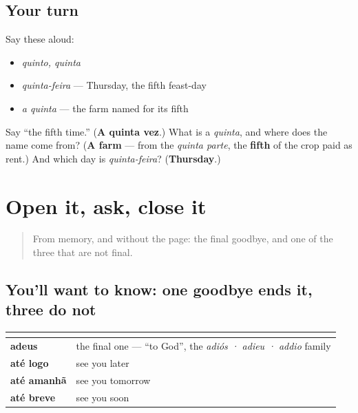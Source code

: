 \subsection*{Your turn}
Say these aloud:

\begin{itemize}
\raggedright
  \item \emph{quinto, quinta}
  \item \emph{quinta-feira} — Thursday, the fifth feast-day
  \item \emph{a quinta} — the farm named for its fifth
\end{itemize}

\begin{tcolorbox}[breakable,colback=teal!4,colframe=teal!35!black,title={Before you move on}]
Say \textquotedblleft{}the fifth time.\textquotedblright{} (\textbf{A quinta vez}.) What is a \emph{quinta}, and where does the name come from? (\textbf{A farm} — from the \emph{quinta parte}, the \textbf{fifth} of the crop paid as rent.) And which day is \emph{quinta-feira}? (\textbf{Thursday}.)
\end{tcolorbox}
\section[(practice)]{Open it, ask, close it}

\label{lesson:PT-C27-second-pass-greet-ask-close}



\begin{quote}
From memory, and without the page: the final goodbye, and one of the three that are not final.
\end{quote}

\subsection*{You'll want to know: one goodbye ends it, three do not}
\noindent
\begin{tabularx}{\linewidth}{@{}>{\raggedright\arraybackslash}X>{\raggedright\arraybackslash}X@{}}
\toprule
\textbf{} & \textbf{} \\
\midrule
\textbf{adeus} & the final one — \textquotedblleft{}to God\textquotedblright{}, the \emph{adiós · adieu · addio} family \\
\textbf{até logo} & see you later \\
\textbf{até amanhã} & see you tomorrow \\
\textbf{até breve} & see you soon \\
\bottomrule
\end{tabularx}

